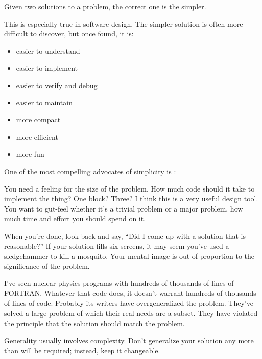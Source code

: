 \begin{tfquot}
Given two solutions to a problem, the correct one is the simpler.
\end{tfquot}
This is especially true in software design. The simpler solution is often
more difficult to discover, but once found, it is:

\begin{itemize}
\item easier to understand
\item easier to implement
\item easier to verify and debug
\item easier to maintain
\item more compact
\item more efficient
\item more fun
\end{itemize}

\begin{interview}
One of the most compelling advocates of simplicity is
:

\begin{tfquot}
You need a feeling for the size of the problem. How much code should
it take to implement the thing? One block? Three? I think this is a
very useful design tool. You want to gut-feel whether it's a trivial
problem or a major problem, how much time and effort you should spend
on it.

When you're done, look back and say, ``Did I come up with a solution
that is reasonable?'' If your solution fills six screens, it may seem
you've used a sledgehammer to kill a mosquito. Your mental image is
out of proportion to the significance of the problem.

I've seen nuclear physics programs with hundreds of thousands of lines
of FORTRAN. Whatever that code does, it doesn't warrant hundreds of
thousands of lines of code. Probably its writers have overgeneralized
the problem. They've solved a large problem of which their real needs
are a subset. They have violated the principle that the solution
should match the problem.
\end{tfquot}
\end{interview}

\begin{tip}
Generality usually involves complexity. Don't generalize your solution any
more than will be required; instead, keep it changeable.
\end{tip}

